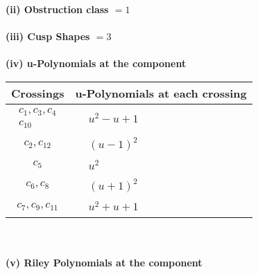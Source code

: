 \documentclass[1p]{elsarticle_modified}
\theoremstyle{definition}
\begin{document}
\flushleft \textbf{(ii) Obstruction class $= 1$}\\~\\
\flushleft \textbf{(iii) Cusp Shapes $= 3$}\\~\\
\newpage\renewcommand{\arraystretch}{1}
\flushleft \textbf{(iv) u-Polynomials at the component}\newline \\
\begin{tabular}{m{50pt}|m{274pt}}
Crossings & \hspace{64pt}u-Polynomials at each crossing \\
\hline $$\begin{aligned}c_{1},c_{3},c_{4}\\c_{10}\end{aligned}$$&$\begin{aligned}
&u^2- u+1
\end{aligned}$\\
\hline $$\begin{aligned}c_{2},c_{12}\end{aligned}$$&$\begin{aligned}
&(u-1)^2
\end{aligned}$\\
\hline $$\begin{aligned}c_{5}\end{aligned}$$&$\begin{aligned}
&u^2
\end{aligned}$\\
\hline $$\begin{aligned}c_{6},c_{8}\end{aligned}$$&$\begin{aligned}
&(u+1)^2
\end{aligned}$\\
\hline $$\begin{aligned}c_{7},c_{9},c_{11}\end{aligned}$$&$\begin{aligned}
&u^2+u+1
\end{aligned}$\\
\hline
\end{tabular}\\~\\
\newpage\renewcommand{\arraystretch}{1}
\flushleft \textbf{(v) Riley Polynomials at the component}\newline \\
\end{document}
